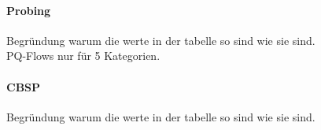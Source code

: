 \paragraph{Probing}
Begründung warum die werte in der tabelle so sind wie sie sind. \\

PQ-Flows nur für 5 Kategorien.

\paragraph{CBSP}
Begründung warum die werte in der tabelle so sind wie sie sind. \\
